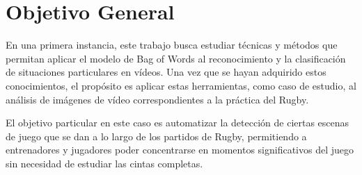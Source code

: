 \section{Objetivo General}
\iffalse
Explique el problema o situación de referencia en el que se desarrolla la
propuesta o los interrogantes en el campo disciplinario a los que la propuesta se
dirige. Desarrolle la importancia e impacto de los objetivos y el conocimiento
que se generará. En esta sección no es necesario describir las tareas específicas
que se realizarán (para eso, ver Objetivos específicos).
\fi
En una primera instancia, este trabajo busca estudiar técnicas y métodos que permitan aplicar el modelo de Bag of Words
al reconocimiento y la clasificación de situaciones particulares en vídeos. 
Una vez que se hayan adquirido estos conocimientos, el propósito es aplicar estas herramientas, como caso de estudio, al análisis de imágenes
de vídeo correspondientes a la práctica del Rugby.

El objetivo particular en este caso es automatizar la detección de ciertas escenas de juego que se dan a lo largo de los partidos de Rugby, permitiendo a entrenadores
y jugadores poder concentrarse en momentos significativos del juego sin necesidad de estudiar las cintas completas.
